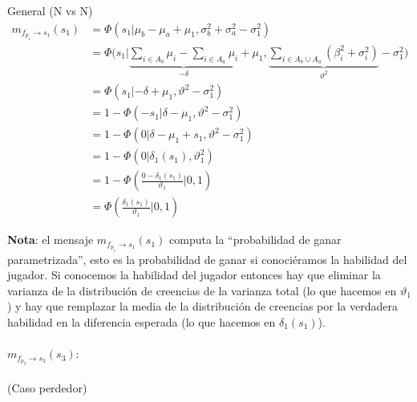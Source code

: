 \documentclass[11pt,twoside,spanish]{report} %
\begin{document}
General (N vs N)
\begin{equation}
	\begin{split}
		m_{f_{p_1} \rightarrow s_1}(s_1) & = \Phi(s_1| \mu_b - \mu_a + \mu_1, \sigma_b^2 +\sigma_a^2 - \sigma_1^2 )  \\
		& = \Phi\Big(s_1| \underbrace{\sum_{i \in A_b} \mu_i - \sum_{i \in A_a} \mu_i} _{ -\delta}  + \mu_1 , \underbrace{\sum_{i \in A_b \cup A_a} (\beta_i^2 + \sigma_i^2)}_{\vartheta^2} - \sigma_1^2 \Big) \\
		& = \Phi(s_1|-\delta + \mu_1,\vartheta^2-\sigma_1^2) \\
		& = 1- \Phi(-s_1|\delta - \mu_1 ,\vartheta^2-\sigma_1^2) \\
		& = 1- \Phi(0|\delta - \mu_1 + s_1 ,\vartheta^2-\sigma_1^2) \\
		& = 1- \Phi(0|\delta_1(s_1),\vartheta_1^2) \\
		&= 1- \Phi\left(\frac{0-\delta_1(s_1)}{\vartheta_1}|0,1\right)\\
		&= \Phi\left(\frac{\delta_1(s_1)}{\vartheta_1}|0,1\right)
	\end{split}
\end{equation}

\textbf{Nota}: el mensaje $m_{f_{p_1} \rightarrow s_1}(s_1)$ computa la ``probabilidad de ganar parametrizada'', esto es la probabilidad de ganar si conoci\'eramos la habilidad del jugador. Si conocemos la habilidad del jugador entonces hay que eliminar la varianza de la distribuci\'on de creencias de la varianza total (lo que hacemos en $\vartheta_1$) y hay que remplazar la media de la distribuci\'on de creencias por la verdadera habilidad en la diferencia esperada (lo que hacemos en $\delta_1(s_1)$).


\paragraph{$m_{f_{p_3} \rightarrow s_3}(s_3):$}(Caso perdedor)
\end{document}
